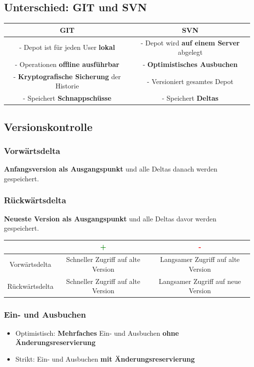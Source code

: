 	\subsection{Unterschied: GIT und SVN}
		
		\begin{center}
			\begin{tabular}{c|c}
				\textbf{GIT}                                      & \textbf{SVN} \\
				\hline
				- Depot ist für jeden User \textbf{lokal}         & - Depot wird \textbf{auf einem Server} abgelegt \\
				- Operationen \textbf{offline ausführbar}         & - \textbf{Optimistisches Ausbuchen} \\
				- \textbf{Kryptografische Sicherung} der Historie & - Versioniert gesamtes Depot \\
				- Speichert \textbf{Schnappschüsse}               & - Speichert \textbf{Deltas} \\
			\end{tabular}
		\end{center}
		
	\subsection{Versionskontrolle}
		
		\subsubsection{Vorwärtsdelta}
		
			\textbf{Anfangsversion als Ausgangspunkt} und alle Deltas danach werden gespeichert.
			
		\subsubsection{Rückwärtsdelta}
			
			\textbf{Neueste Version als Ausgangspunkt} und alle Deltas davor werden gespeichert.
				
			\begin{tabular}{c|c|c}
				               & \textcolor{green}{\textbf{+}}      & \textcolor{red}{\textbf{-}} \\
				\hline
				Vorwärtsdelta  & Schneller Zugriff auf alte Version & Langsamer Zugriff auf alte Version \\
				\hline
				Rückwärtsdelta & Schneller Zugriff auf alte Version & Langsamer Zugriff auf neue Version \\
			\end{tabular}
			
		\subsubsection{Ein- und Ausbuchen}
		
			\begin{itemize}
				\item Optimistisch: \textbf{Mehrfaches} Ein- und Ausbuchen \textbf{ohne Änderungsreservierung}
				\item Strikt: Ein- und Ausbuchen \textbf{mit Änderungsreservierung}
			\end{itemize}